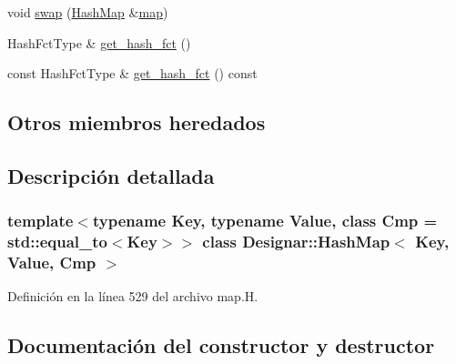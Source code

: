 \begin{DoxyCompactItemize}
\item 
void \hyperlink{class_designar_1_1_hash_map_af4390f5bdd5a0ec5b1d62d0630420854}{swap} (\hyperlink{class_designar_1_1_hash_map}{Hash\+Map} \&\hyperlink{class_designar_1_1_container_algorithms_a3b9044a197e4ceec6a1de03de197a293}{map})
\item 
Hash\+Fct\+Type \& \hyperlink{class_designar_1_1_hash_map_abcb9cdbb25c6d35f0f0373011265d570}{get\+\_\+hash\+\_\+fct} ()
\item 
const Hash\+Fct\+Type \& \hyperlink{class_designar_1_1_hash_map_a7372936ee9f2da7dbbc06a54955b9833}{get\+\_\+hash\+\_\+fct} () const
\end{DoxyCompactItemize}
\subsection*{Otros miembros heredados}


\subsection{Descripción detallada}
\subsubsection*{template$<$typename Key, typename Value, class Cmp = std\+::equal\+\_\+to$<$\+Key$>$$>$\newline
class Designar\+::\+Hash\+Map$<$ Key, Value, Cmp $>$}



Definición en la línea 529 del archivo map.\+H.



\subsection{Documentación del constructor y destructor}
\mbox{\label{class_designar_1_1_hash_map_a39b8b365b9399ca72142f522d8d4e877}} 
